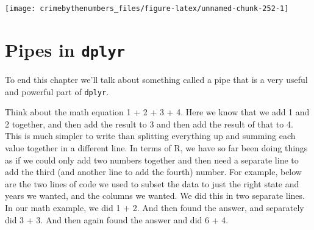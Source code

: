 \documentclass[
]{krantz}
\begin{document}
\begin{center}\texttt{[image: crimebythenumbers\_files/figure-latex/unnamed-chunk-252-1]} \end{center}

\hypertarget{dplyr-pipes}{%
\section{\texorpdfstring{Pipes in
\texttt{dplyr}}{Pipes in dplyr}}\label{dplyr-pipes}}

To end this chapter we'll talk about something called a pipe
that is a very useful and powerful part of \texttt{dplyr}.

Think about the math equation 1 + 2 + 3 + 4. Here we know
that we add 1 and 2 together, and then add the result to 3
and then add the result of that to 4. This is much simpler
to write than splitting everything up and summing each value
together in a different line. In terms of R, we have so far
been doing things as if we could only add two numbers
together and then need a separate line to add the third (and
another line to add the fourth) number. For example, below
are the two lines of code we used to subset the data to just
the right state and years we wanted, and the columns we
wanted. We did this in two separate lines. In our math
example, we did 1 + 2. And then found the answer, and
separately did 3 + 3. And then again found the answer and
did 6 + 4.
\end{document}
